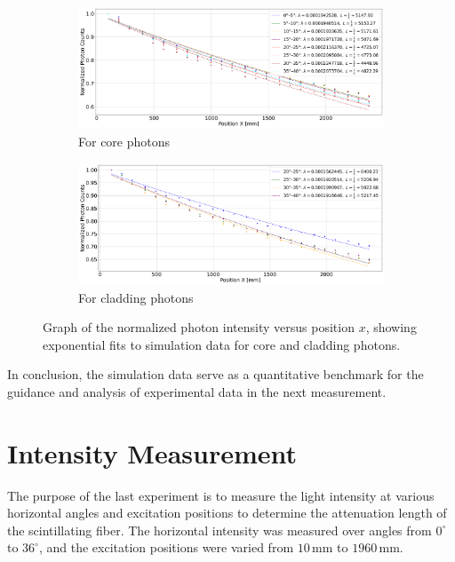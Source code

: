 \begin{figure}[H]
    \centering
    \begin{subfigure}[t]{0.9\textwidth}
        \centering
        \includegraphics[width=\textwidth]{Figure/fit_40_core.png}
        \caption{For core photons}
    \end{subfigure}
    
    \vspace{1em}  %

    \begin{subfigure}[t]{0.9\textwidth}
        \centering
        \includegraphics[width=\textwidth]{Figure/fit_40_clad.png}
        \caption{For cladding photons}
    \end{subfigure}

    \caption{
        Graph of the normalized photon intensity versus position \( x \), showing exponential fits to simulation data for core and cladding photons.
    }
    \label{fit_1}
\end{figure}

    In conclusion, the simulation data serve as a quantitative benchmark for the guidance and analysis of experimental data in the next measurement.
    
    \section{Intensity Measurement}
    The purpose of the last experiment is to measure the light intensity at various horizontal angles and excitation positions to determine the attenuation length of the scintillating fiber. The horizontal intensity was measured over angles from \( 0^\circ \) to \( 36^\circ \), and the excitation positions were varied from \( 10\,\text{mm} \) to \( 1960\,\text{mm} \). \\

